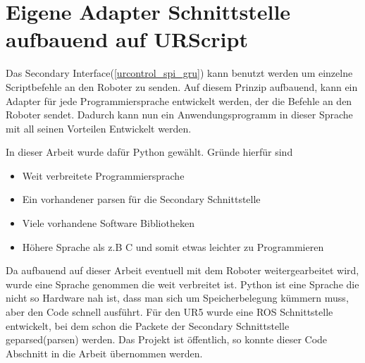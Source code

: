 \section{Eigene Adapter Schnittstelle aufbauend auf URScript}
\label{sec:urscript_adapter}

Das Secondary Interface(\ref{urcontrol_spi_gru}) kann benutzt werden um einzelne Scriptbefehle an den Roboter zu senden. Auf diesem Prinzip aufbauend, kann ein Adapter für jede Programmiersprache entwickelt werden, der die Befehle an den Roboter sendet. Dadurch kann nun ein Anwendungsprogramm in dieser Sprache mit all seinen Vorteilen Entwickelt werden.

In dieser Arbeit wurde dafür Python gewählt. Gründe hierfür sind

\begin{itemize}
\item Weit verbreitete Programmiersprache
\item Ein vorhandener \acl{parsen} für die Secondary Schnittstelle
\item Viele vorhandene \acs{Software Bibliotheken}
\item Höhere Sprache als z.B C und somit etwas leichter zu Programmieren
\end{itemize}

Da aufbauend auf dieser Arbeit eventuell mit dem Roboter weitergearbeitet wird, wurde eine Sprache genommen die weit verbreitet ist. Python ist eine Sprache die nicht so Hardware nah ist, dass man sich um Speicherbelegung kümmern muss, aber den Code schnell ausführt.
Für den UR5 wurde eine \ac{ROS} Schnittstelle entwickelt, bei dem schon die Packete der Secondary Schnittstelle geparsed(\acl{parsen}) werden. Das Projekt ist öffentlich, so konnte dieser Code Abschnitt in die Arbeit übernommen werden.